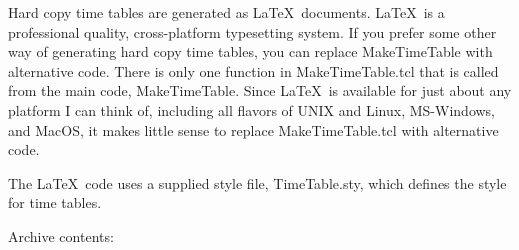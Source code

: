 Hard copy time tables are generated as \LaTeX\ documents.  \LaTeX\ is a
professional quality, cross-platform typesetting system.  If you prefer
some other way of generating hard copy time tables, you can replace
MakeTimeTable with alternative code.  There is only one function in
MakeTimeTable.tcl that is called from the main code, MakeTimeTable. 
Since \LaTeX\ is available for just about any platform I can think of,
including all flavors of UNIX and Linux, MS-Windows, and MacOS, it makes
little sense to replace MakeTimeTable.tcl with alternative code.

The \LaTeX\ code uses a supplied style file, TimeTable.sty, which defines
the style for time tables.

Archive contents:

\begin{description}


\end{description}
